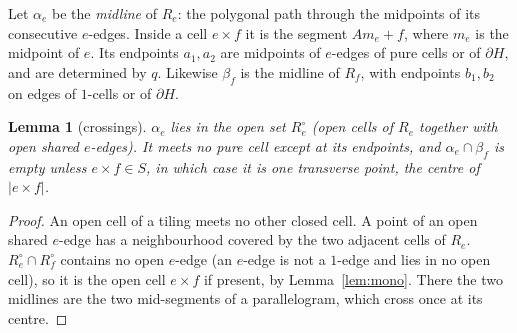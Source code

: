 \documentclass[11pt]{article}
\newtheorem{lemma}[theorem]{Lemma}
\theoremstyle{definition}
\begin{document}
Let $\alpha_e$ be the \emph{midline} of $R_e$: the polygonal path through the midpoints of its consecutive $e$-edges. Inside a cell $e\times f$ it is the segment
$Am_e+f$, where $m_e$ is the midpoint of $e$. Its endpoints $a_1,a_2$ are midpoints of $e$-edges of pure cells or of $\partial H$, and are
determined by $q$. Likewise $\beta_f$ is the midline of $R_f$, with endpoints $b_1,b_2$ on edges of $1$-cells or of $\partial H$.
\begin{lemma}[crossings]\label{lem:cross}
$\alpha_e$ lies in the open set $R_e^\circ$ (open cells of $R_e$ together with open shared $e$-edges). It meets no pure cell except at its endpoints, and $\alpha_e\cap\beta_f$ is empty
unless $e\times f\in S$, in which case it is one transverse point, the centre of $|e\times f|$.
\end{lemma}
\begin{proof}
An open cell of a tiling meets no other closed cell. A point of an open shared $e$-edge has a neighbourhood covered by the two adjacent cells of $R_e$. $R_e^\circ\cap R_f^\circ$
contains no open $e$-edge (an $e$-edge is not a $1$-edge and lies in no open cell), so it is the open cell $e\times f$ if present, by Lemma~\ref{lem:mono}. There the two midlines are the two
mid-segments of a parallelogram, which cross once at its centre.
\end{proof}
\end{document}
